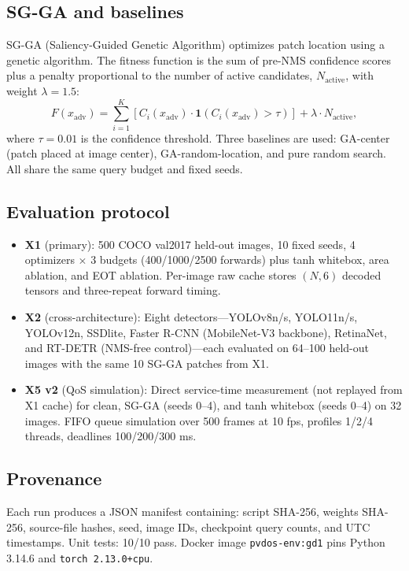 \documentclass[a4paper,fleqn]{cas-dc}
\begin{document}
\subsection{SG-GA and baselines}

SG-GA (Saliency-Guided Genetic Algorithm) optimizes patch location using a genetic algorithm. The fitness function is the sum of pre-NMS confidence scores plus a penalty proportional to the number of active candidates, $N_\text{active}$, with weight $\lambda = 1.5$:
\begin{equation}
    F(x_\text{adv}) = \sum_{i=1}^{K} \left[ C_i(x_\text{adv}) \cdot \mathbf{1}(C_i(x_\text{adv}) > \tau) \right] + \lambda \cdot N_\text{active},
\end{equation}
where $\tau = 0.01$ is the confidence threshold. Three baselines are used: GA-center (patch placed at image center), GA-random-location, and pure random search. All share the same query budget and fixed seeds.

\subsection{Evaluation protocol}

\begin{itemize}
    \item \textbf{X1} (primary): 500 COCO val2017 held-out images, 10 fixed seeds, 4 optimizers $\times$ 3 budgets (400/1000/2500 forwards) plus tanh whitebox, area ablation, and EOT ablation. Per-image raw cache stores $(N,6)$ decoded tensors and three-repeat forward timing.
    \item \textbf{X2} (cross-architecture): Eight detectors---YOLOv8n/s, YOLO11n/s, YOLOv12n, SSDlite, Faster R-CNN (MobileNet-V3 backbone), RetinaNet, and RT-DETR (NMS-free control)---each evaluated on 64--100 held-out images with the same 10 SG-GA patches from X1.
    \item \textbf{X5 v2} (QoS simulation): Direct service-time measurement (not replayed from X1 cache) for clean, SG-GA (seeds 0--4), and tanh whitebox (seeds 0--4) on 32 images. FIFO queue simulation over 500 frames at 10 fps, profiles 1/2/4 threads, deadlines 100/200/300 ms.
\end{itemize}

\subsection{Provenance}

Each run produces a JSON manifest containing: script SHA-256, weights SHA-256, source-file hashes, seed, image IDs, checkpoint query counts, and UTC timestamps. Unit tests: 10/10 pass. Docker image \texttt{pvdos-env:gd1} pins Python 3.14.6 and \texttt{torch 2.13.0+cpu}.
\end{document}
